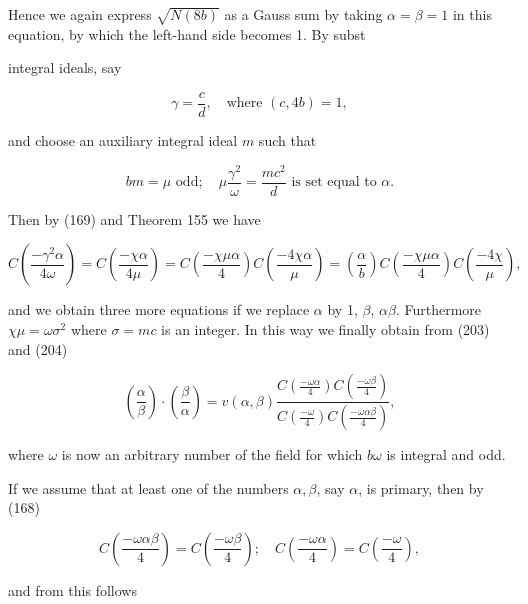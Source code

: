 Hence we again express $\sqrt{N(8b)}$ as a Gauss sum by taking $\alpha = \beta = 1$ in this equation, by which the left-hand side becomes 1. By subst

integral ideals, say

$$\gamma = \frac{c}{d}, \quad \text{where } (c, 4b) = 1,$$

and choose an auxiliary integral ideal $m$ such that

$$bm = \mu \text{ odd}; \quad \mu \frac{\gamma^2}{\omega} = \frac{mc^2}{d} \text{ is set equal to } \alpha.$$

Then by (169) and Theorem 155 we have

$$C\left(\frac{-\gamma^2\alpha}{4\omega}\right) = C\left(\frac{-\chi\alpha}{4\mu}\right) = C\left(\frac{-\chi\mu\alpha}{4}\right) C\left(\frac{-4\chi\alpha}{\mu}\right) = \left(\frac{\alpha}{b}\right) C\left(\frac{-\chi\mu\alpha}{4}\right) C\left(\frac{-4\chi}{\mu}\right),$$

and we obtain three more equations if we replace $\alpha$ by 1, $\beta$, $\alpha\beta$. Furthermore $\chi\mu = \omega\sigma^2$ where $\sigma = mc$ is an integer. In this way we finally obtain from (203) and (204)

$$\left(\frac{\alpha}{\beta}\right) \cdot \left(\frac{\beta}{\alpha}\right) = v(\alpha, \beta) \frac{C\left(\frac{-\omega\alpha}{4}\right) C\left(\frac{-\omega\beta}{4}\right)}{C\left(\frac{-\omega}{4}\right) C\left(\frac{-\omega\alpha\beta}{4}\right)},$$

where $\omega$ is now an arbitrary number of the field for which $b\omega$ is integral and odd.

If we assume that at least one of the numbers $\alpha, \beta$, say $\alpha$, is primary, then by (168)

$$C\left(\frac{-\omega\alpha\beta}{4}\right) = C\left(\frac{-\omega\beta}{4}\right); \quad C\left(\frac{-\omega\alpha}{4}\right) = C\left(\frac{-\omega}{4}\right),$$

and from this follows
